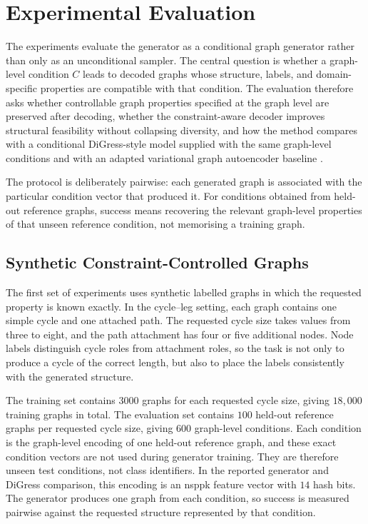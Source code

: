 \section{Experimental Evaluation}
\label{sec:generator:experiments}

The experiments evaluate the generator as a conditional graph generator rather
than only as an unconditional sampler. The central question is whether a
graph-level condition \(C\) leads to decoded graphs whose structure, labels, and
domain-specific properties are compatible with that condition. The evaluation
therefore asks whether controllable graph properties specified at the graph
level are preserved after decoding, whether the constraint-aware decoder improves
structural feasibility without collapsing diversity, and how the method compares
with a conditional DiGress-style model \citep{vignac2022digress} supplied with
the same graph-level conditions and with an adapted variational graph
autoencoder baseline \citep{kipf2016vgae,simonovsky2018graphvae}.

The protocol is deliberately pairwise: each generated graph is associated with
the particular condition vector that produced it. For conditions obtained from
held-out reference graphs, success means recovering the relevant graph-level
properties of that unseen reference condition, not memorising a training graph.

\subsection{Synthetic Constraint-Controlled Graphs}

The first set of experiments uses synthetic labelled graphs in which the
requested property is known exactly. In the cycle--leg setting, each graph
contains one simple cycle and one attached path. The requested cycle size takes
values from three to eight, and the path attachment has four or five additional
nodes. Node labels distinguish cycle roles from attachment roles, so the task is
not only to produce a cycle of the correct length, but also to place the labels
consistently with the generated structure.

The training set contains \(3000\) graphs for each requested cycle size, giving
\(18{,}000\) training graphs in total. The evaluation set contains \(100\)
held-out reference graphs per requested cycle size, giving \(600\) graph-level
conditions. Each condition is the graph-level encoding of one held-out reference
graph, and these exact condition vectors are not used during generator training.
They are therefore unseen test conditions, not class identifiers. In the reported
generator and DiGress comparison, this encoding is an \gls{nsppk} feature vector
with \(14\) hash bits. The generator produces one graph from each condition, so
success is measured pairwise against the requested structure represented by that
condition.

